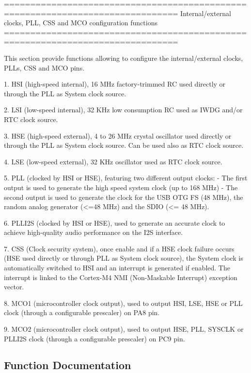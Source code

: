 \begin{DoxyVerb} ===============================================================================
      Internal/external clocks, PLL, CSS and MCO configuration functions
 ===============================================================================  

  This section provide functions allowing to configure the internal/external clocks,
  PLLs, CSS and MCO pins.
  
  1. HSI (high-speed internal), 16 MHz factory-trimmed RC used directly or through
     the PLL as System clock source.

  2. LSI (low-speed internal), 32 KHz low consumption RC used as IWDG and/or RTC
     clock source.

  3. HSE (high-speed external), 4 to 26 MHz crystal oscillator used directly or
     through the PLL as System clock source. Can be used also as RTC clock source.

  4. LSE (low-speed external), 32 KHz oscillator used as RTC clock source.   

  5. PLL (clocked by HSI or HSE), featuring two different output clocks:
      - The first output is used to generate the high speed system clock (up to 168 MHz)
      - The second output is used to generate the clock for the USB OTG FS (48 MHz),
        the random analog generator (<=48 MHz) and the SDIO (<= 48 MHz).

  6. PLLI2S (clocked by HSI or HSE), used to generate an accurate clock to achieve 
     high-quality audio performance on the I2S interface.
  
  7. CSS (Clock security system), once enable and if a HSE clock failure occurs 
     (HSE used directly or through PLL as System clock source), the System clock
     is automatically switched to HSI and an interrupt is generated if enabled. 
     The interrupt is linked to the Cortex-M4 NMI (Non-Maskable Interrupt) 
     exception vector.   

  8. MCO1 (microcontroller clock output), used to output HSI, LSE, HSE or PLL
     clock (through a configurable prescaler) on PA8 pin.

  9. MCO2 (microcontroller clock output), used to output HSE, PLL, SYSCLK or PLLI2S
     clock (through a configurable prescaler) on PC9 pin.\end{DoxyVerb}
 

\subsection{Function Documentation}
\mbox{\label{group___r_c_c___group1_gaa2d6a35f5c2e0f86317c3beb222677fc}} 
